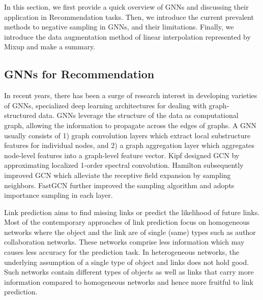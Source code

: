 In this section, we first provide a quick overview of GNNs and discussing their application in Recommendation tasks. Then, we introduce the current prevalent methods to negative sampling in GNNs, and their limitations. Finally, we introduce the data augmentation method of linear interpolation represented by Mixup \cite{mixup} and make a summary.

\subsection{GNNs for Recommendation}
In recent years, there has been a surge of research interest in developing varieties of GNNs, specialized deep learning architectures for dealing with graph-structured data. GNNs leverage the structure of the data as computational graph, allowing the information to propagate across the edges of graphs. A GNN usually consists of 1) graph convolution layers which extract local substructure features for individual nodes, and 2) a graph aggregation layer which aggregates node-level features into a graph-level feature vector.
Kipf \etal \cite{gcn} designed GCN by approximating localized 1-order spectral convolution.
Hamilton \etal \cite{graphsage} subsequently improved GCN which alleviate the receptive field expansion by sampling neighbors.
FastGCN \cite{fastgcn} further improved the sampling algorithm and adopts importance sampling in each layer.

Link prediction aims to find missing links or predict the likelihood of future links. Most of the contemporary approaches of link prediction focus on homogeneous networks where the object and the link are of single (same) types such as author collaboration networks. These networks comprise less information which may causes less accuracy for the prediction task. In heterogeneous networks, the underlying assumption of a single type of object and links does not hold good. Such networks contain different types of objects as well as links that carry more information compared to homogeneous networks and hence more fruitful to link prediction.

